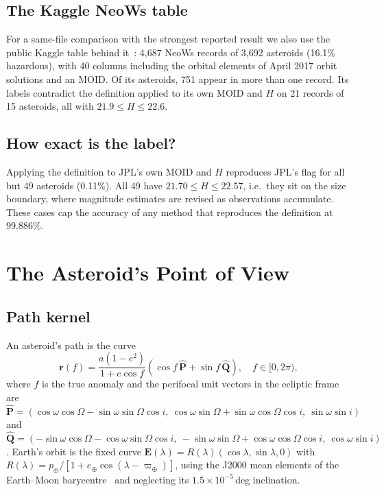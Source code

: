 \documentclass[make,article,submit,moreauthors]{Definitions/mdpi}
\begin{document}
\subsection{The Kaggle NeoWs table}
For a same-file comparison with the strongest reported result we also use the public Kaggle table behind it~\cite{kaggle_nasa,chandra2025,malakouti2023}: 4,687 NeoWs records of 3,692 asteroids (16.1\% hazardous), with 40 columns including the orbital elements of April 2017 orbit solutions and an MOID. Of its asteroids, 751 appear in more than one record. Its labels contradict the definition applied to its own MOID and $H$ on 21 records of 15 asteroids, all with $21.9 \le H \le 22.6$.

\subsection{How exact is the label?}
Applying the definition to JPL's own MOID and $H$ reproduces JPL's flag for all but 49 asteroids (0.11\%). All 49 have $21.70 \le H \le 22.57$, i.e.\ they sit on the size boundary, where magnitude estimates are revised as observations accumulate. These cases cap the accuracy of any method that reproduces the definition at 99.886\%.

\section{The Asteroid's Point of View}

\subsection{Path kernel}
An asteroid's path is the curve
\begin{equation}
\mathbf{r}(f) = \frac{a(1-e^2)}{1+e\cos f}\left(\cos f\,\hat{\mathbf{P}} + \sin f\,\hat{\mathbf{Q}}\right), \quad f \in [0, 2\pi),
\label{eq:path}
\end{equation}
where $f$ is the true anomaly and the perifocal unit vectors in the ecliptic frame are
$\hat{\mathbf{P}} = (\cos\omega\cos\Omega - \sin\omega\sin\Omega\cos i,\ \cos\omega\sin\Omega + \sin\omega\cos\Omega\cos i,\ \sin\omega\sin i)$ and
$\hat{\mathbf{Q}} = (-\sin\omega\cos\Omega - \cos\omega\sin\Omega\cos i,\ -\sin\omega\sin\Omega + \cos\omega\cos\Omega\cos i,\ \cos\omega\sin i)$.
Earth's orbit is the fixed curve $\mathbf{E}(\lambda) = R(\lambda)(\cos\lambda, \sin\lambda, 0)$ with $R(\lambda) = p_\oplus/[1 + e_\oplus\cos(\lambda - \varpi_\oplus)]$, using the J2000 mean elements of the Earth--Moon barycentre~\cite{standish_approx} and neglecting its $1.5\times10^{-5}$\,deg inclination.
\end{document}
